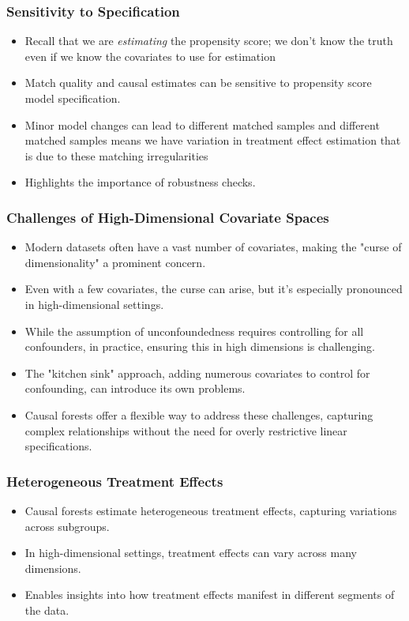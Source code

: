 \documentclass{beamer}
\begin{document}
\begin{frame}
\frametitle{Sensitivity to Specification}
\begin{itemize}
	\item Recall that we are \emph{estimating} the propensity score; we don't know the truth even if we know the covariates to use for estimation
    \item Match quality and causal estimates can be sensitive to propensity score model specification.
    \item Minor model changes can lead to different matched samples and different matched samples means we have variation in treatment effect estimation that is due to these matching irregularities
    \item Highlights the importance of robustness checks.
\end{itemize}
\end{frame}

\begin{frame}
\frametitle{Challenges of High-Dimensional Covariate Spaces}
\begin{itemize}
    \item Modern datasets often have a vast number of covariates, making the "curse of dimensionality" a prominent concern.
    \item Even with a few covariates, the curse can arise, but it's especially pronounced in high-dimensional settings.
    \item While the assumption of unconfoundedness requires controlling for all confounders, in practice, ensuring this in high dimensions is challenging.
    \item The "kitchen sink" approach, adding numerous covariates to control for confounding, can introduce its own problems.
    \item Causal forests offer a flexible way to address these challenges, capturing complex relationships without the need for overly restrictive linear specifications.
\end{itemize}
\end{frame}


\begin{frame}
\frametitle{Heterogeneous Treatment Effects}
\begin{itemize}
    \item Causal forests estimate heterogeneous treatment effects, capturing variations across subgroups.
    \item In high-dimensional settings, treatment effects can vary across many dimensions.
    \item Enables insights into how treatment effects manifest in different segments of the data.
\end{itemize}
\end{frame}
\end{document}
